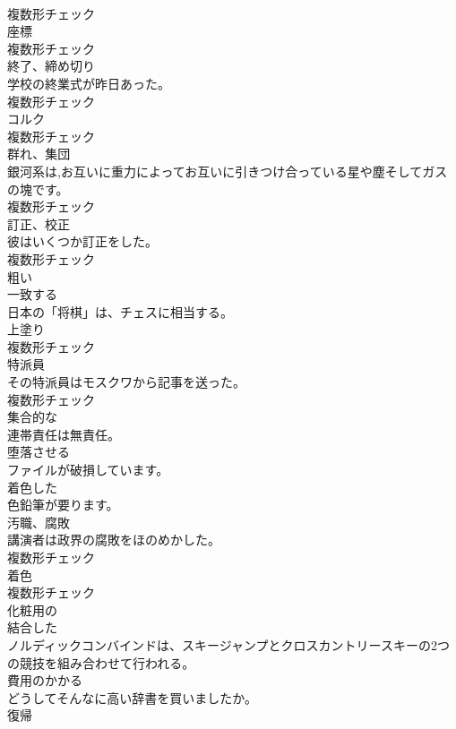 \documentclass[8pt]{extreport}
\begin{document}
\begin{CJK}{UTF8}{min}
\\	複数形チェック
\\	[名詞]	座標	
\\	複数形チェック
\\	[名詞]	終了、締め切り	
\\	学校の終業式が昨日あった。	
\\	複数形チェック
\\	[名詞]	コルク	
\\	複数形チェック
\\	[名詞]	群れ、集団	
\\	銀河系は,お互いに重力によってお互いに引きつけ合っている星や塵そしてガスの塊です。	
\\	複数形チェック
\\	[名詞]	訂正、校正	
\\	彼はいくつか訂正をした。	
\\	複数形チェック
\\	[形容詞]	粗い	
\\	[動詞]	一致する	
\\	日本の「将棋」は、チェスに相当する。	
\\	[名詞]	上塗り	
\\	複数形チェック
\\	[名詞]	特派員	
\\	その特派員はモスクワから記事を送った。	
\\	複数形チェック
\\	[形容詞]	集合的な	
\\	連帯責任は無責任。	
\\	[動詞]	堕落させる	
\\	ファイルが破損しています。	
\\	[形容詞]	着色した	
\\	色鉛筆が要ります。	
\\	[名詞]	汚職、腐敗	
\\	講演者は政界の腐敗をほのめかした。	
\\	複数形チェック
\\	[名詞]	着色	
\\	複数形チェック
\\	[形容詞]	化粧用の	
\\	[形容詞]	結合した	
\\	ノルディックコンバインドは、スキージャンプとクロスカントリースキーの2つの競技を組み合わせて行われる。	
\\	[形容詞]	費用のかかる	
\\	どうしてそんなに高い辞書を買いましたか。	
\\	[名詞]	復帰	

\end{CJK}
\end{document}
